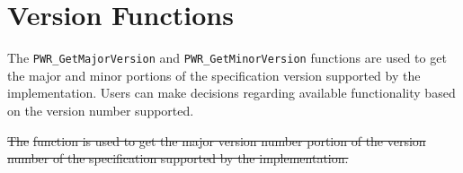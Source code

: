 \documentclass[12pt]{report} %
\providecommand{\DIFdeltex}[1]{{\protect\color{red}\sout{#1}}}                      %
\providecommand{\DIFdelbegin}{} %
\providecommand{\DIFdel}[1]{\texorpdfstring{\DIFdeltex{#1}}{}} %
\newcommand{\DIFscaledelfig}{0.5}
\newlength{\DIFdelgraphicswidth} %
\newlength{\DIFdelgraphicsheight} %
\newcommand{\DIFdelincludegraphics}[2][]{%
\sbox{\DIFdelgraphicsbox}{\DIFOincludegraphics[#1]{#2}}%
\settoboxwidth{\DIFdelgraphicswidth}{\DIFdelgraphicsbox} %
\settoboxtotalheight{\DIFdelgraphicsheight}{\DIFdelgraphicsbox} %
\scalebox{\DIFscaledelfig}{%
\parbox[b]{\DIFdelgraphicswidth}{\usebox{\DIFdelgraphicsbox}\\[-\baselineskip] \rule{\DIFdelgraphicswidth}{0em}}\llap{\resizebox{\DIFdelgraphicswidth}{\DIFdelgraphicsheight}{%
\setlength{\unitlength}{\DIFdelgraphicswidth}%
\begin{picture}(1,1)%
\thicklines\linethickness{2pt} %
{\color[rgb]{1,0,0}\put(0,0){\framebox(1,1){}}}%
{\color[rgb]{1,0,0}\put(0,0){\line( 1,1){1}}}%
{\color[rgb]{1,0,0}\put(0,1){\line(1,-1){1}}}%
\end{picture}%
}\hspace*{3pt}}} %
} %
\DeclareRobustCommand{\DIFdelbegin}{\DIFOdelbegin \let\includegraphics\DIFdelincludegraphics} %
\begin{document}
\section{Version Functions}\label{sec:VersionFunctions}

The \texttt{PWR_GetMajorVersion} and \texttt{PWR_GetMinorVersion} functions are used to get the major and minor portions of the specification version supported by the implementation. 
Users can make decisions regarding available functionality based on the version number supported.

\DIFdelbegin %
\DIFdel{The }%
\DIFdel{function is used to get the major version number portion of the version number of the specification supported by the implementation.
}%

\end{document}
